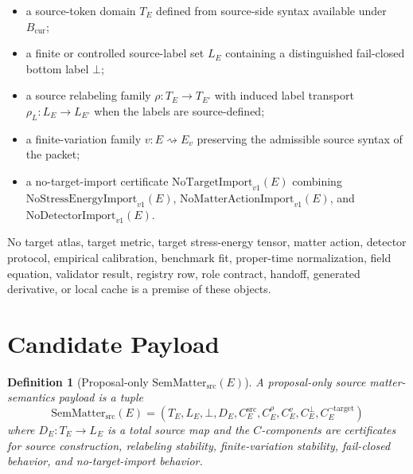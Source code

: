 \documentclass[11pt]{article}
\newtheorem{definition}{Definition}
\newcommand{\Bcur}{B_{\mathrm{cur}}}
\newcommand{\SemMatterSrc}{\mathrm{SemMatter}_{\mathrm{src}}}
\newcommand{\NoTarget}{\mathrm{NoTargetImport}_{v1}}
\newcommand{\NoSE}{\mathrm{NoStressEnergyImport}_{v1}}
\newcommand{\NoAct}{\mathrm{NoMatterActionImport}_{v1}}
\newcommand{\NoDet}{\mathrm{NoDetectorImport}_{v1}}
\newcommand{\Bottom}{\bot}
\begin{document}
\begin{itemize}
\item a source-token domain \(T_E\) defined from source-side syntax available
  under \(\Bcur\);
\item a finite or controlled source-label set \(L_E\) containing a distinguished
  fail-closed bottom label \(\Bottom\);
\item a source relabeling family \(\rho:T_E\to T_{E'}\) with induced label
  transport \(\rho_L:L_E\to L_{E'}\) when the labels are source-defined;
\item a finite-variation family \(v:E\rightsquigarrow E_v\) preserving the
  admissible source syntax of the packet;
\item a no-target-import certificate \(\NoTarget(E)\) combining
  \(\NoSE(E)\), \(\NoAct(E)\), and \(\NoDet(E)\).
\end{itemize}

No target atlas, target metric, target stress-energy tensor, matter action,
detector protocol, empirical calibration, benchmark fit, proper-time
normalization, field equation, validator result, registry row, role contract,
handoff, generated derivative, or local cache is a premise of these objects.

\section{Candidate Payload}

\begin{definition}[Proposal-only \(\SemMatterSrc(E)\)]
A proposal-only source matter-semantics payload is a tuple
\[
  \SemMatterSrc(E)=
  (T_E,L_E,\Bottom,D_E,C^{\mathrm{src}}_E,C^{\rho}_E,C^v_E,C^\bot_E,C^{\neg\mathrm{target}}_E)
\]
where \(D_E:T_E\to L_E\) is a total source map and the \(C\)-components are
certificates for source construction, relabeling stability, finite-variation
stability, fail-closed behavior, and no-target-import behavior.
\end{definition}
\end{document}
